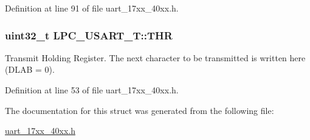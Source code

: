 Definition at line 91 of file uart\+\_\+17xx\+\_\+40xx.\+h.

\subsubsection[{\texorpdfstring{T\+HR}{THR}}]{ uint32\+\_\+t L\+P\+C\+\_\+\+U\+S\+A\+R\+T\+\_\+\+T\+::\+T\+HR}\hypertarget{structLPC__USART__T_ae93392fb8e6c40f5b340ec0cf145ee1b}{}\label{structLPC__USART__T_ae93392fb8e6c40f5b340ec0cf145ee1b}
Transmit Holding Register. The next character to be transmitted is written here (D\+L\+AB = 0). 

Definition at line 53 of file uart\+\_\+17xx\+\_\+40xx.\+h.



The documentation for this struct was generated from the following file\+:\begin{DoxyCompactItemize}
\item 
\hyperlink{uart__17xx__40xx_8h}{uart\+\_\+17xx\+\_\+40xx.\+h}\end{DoxyCompactItemize}
